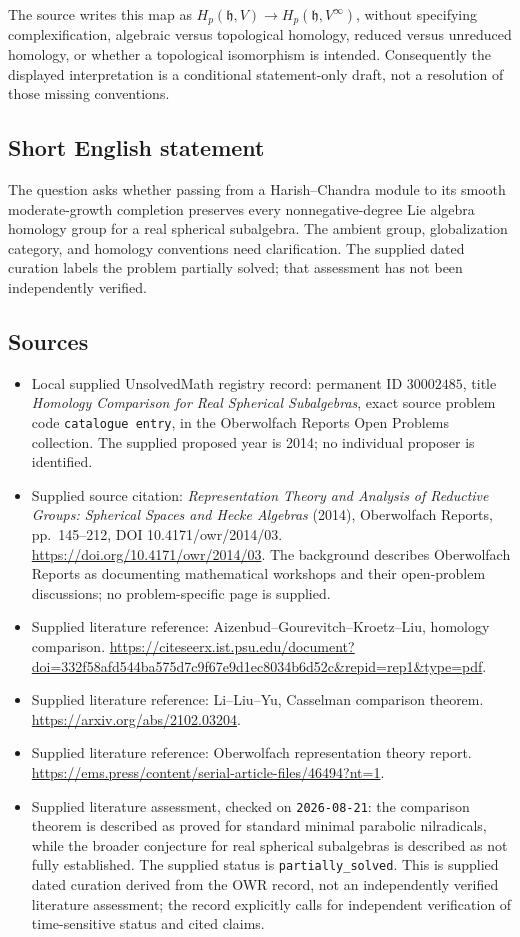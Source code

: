 \documentclass[11pt]{article}
\begin{document}
The source writes this map as \(H_p(\mathfrak h,V)\to H_p(\mathfrak h,V^{\infty})\), without specifying complexification, algebraic versus topological homology, reduced versus unreduced homology, or whether a topological isomorphism is intended. Consequently the displayed interpretation is a conditional statement-only draft, not a resolution of those missing conventions.
\subsection{Short English statement}
The question asks whether passing from a Harish--Chandra module to its smooth moderate-growth completion preserves every nonnegative-degree Lie algebra homology group for a real spherical subalgebra. The ambient group, globalization category, and homology conventions need clarification. The supplied dated curation labels the problem partially solved; that assessment has not been independently verified.
\subsection{Sources}
\begin{itemize}
\item Local supplied UnsolvedMath registry record: permanent ID \(30002485\), title \emph{Homology Comparison for Real Spherical Subalgebras}, exact source problem code \texttt{catalogue entry}, in the Oberwolfach Reports Open Problems collection. The supplied proposed year is 2014; no individual proposer is identified.
\item Supplied source citation: \emph{Representation Theory and Analysis of Reductive Groups: Spherical Spaces and Hecke Algebras} (2014), Oberwolfach Reports, pp.\ 145--212, DOI 10.4171/owr/2014/03. \url{https://doi.org/10.4171/owr/2014/03}. The background describes Oberwolfach Reports as documenting mathematical workshops and their open-problem discussions; no problem-specific page is supplied.
\item Supplied literature reference: Aizenbud--Gourevitch--Kroetz--Liu, homology comparison. \url{https://citeseerx.ist.psu.edu/document?doi=332f58afd544ba575d7c9f67e9d1ec8034b6d52c&repid=rep1&type=pdf}.
\item Supplied literature reference: Li--Liu--Yu, Casselman comparison theorem. \url{https://arxiv.org/abs/2102.03204}.
\item Supplied literature reference: Oberwolfach representation theory report. \url{https://ems.press/content/serial-article-files/46494?nt=1}.
\item Supplied literature assessment, checked on \texttt{2026-08-21}: the comparison theorem is described as proved for standard minimal parabolic nilradicals, while the broader conjecture for real spherical subalgebras is described as not fully established. The supplied status is \texttt{partially\_solved}. This is supplied dated curation derived from the OWR record, not an independently verified literature assessment; the record explicitly calls for independent verification of time-sensitive status and cited claims.
\end{itemize}
\end{document}
